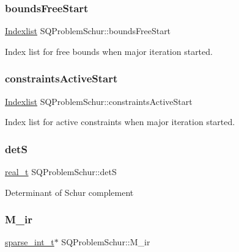 \subsubsection{\texorpdfstring{bounds\+Free\+Start}{boundsFreeStart}}
{\footnotesize\ttfamily \hyperlink{class_indexlist}{Indexlist} S\+Q\+Problem\+Schur\+::bounds\+Free\+Start\hspace{0.3cm}{\ttfamily [protected]}}

Index list for free bounds when major iteration started. \mbox{\label{class_s_q_problem_schur_af5e96d7c752ee66527f37925b429f191}} 
\subsubsection{\texorpdfstring{constraints\+Active\+Start}{constraintsActiveStart}}
{\footnotesize\ttfamily \hyperlink{class_indexlist}{Indexlist} S\+Q\+Problem\+Schur\+::constraints\+Active\+Start\hspace{0.3cm}{\ttfamily [protected]}}

Index list for active constraints when major iteration started. \mbox{\label{class_s_q_problem_schur_aa720518f285aa051c98f5cf80c344928}} 
\subsubsection{\texorpdfstring{detS}{detS}}
{\footnotesize\ttfamily \hyperlink{qp_o_a_s_e_s__wrapper_8h_a0d00e2b3dfadee81331bbb39068570c4}{real\+\_\+t} S\+Q\+Problem\+Schur\+::detS\hspace{0.3cm}{\ttfamily [protected]}}

Determinant of Schur complement \mbox{\label{class_s_q_problem_schur_a6c737312815c2b622c3be4245c71b6d1}} 
\subsubsection{\texorpdfstring{M\+\_\+ir}{M\_ir}}
{\footnotesize\ttfamily \hyperlink{_types_8hpp_aa5432b00c9081e2d62d7f38c32e4ed80}{sparse\+\_\+int\+\_\+t}$\ast$ S\+Q\+Problem\+Schur\+::\+M\+\_\+ir\hspace{0.3cm}{\ttfamily [protected]}}

